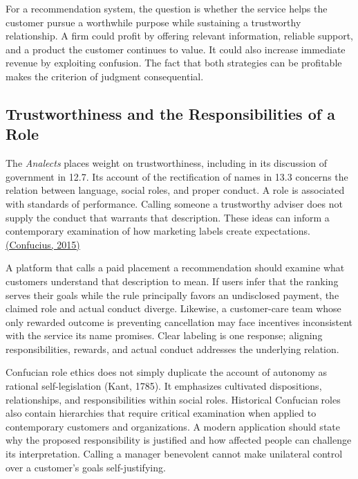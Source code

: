For a recommendation system, the question is whether the service helps
the customer pursue a worthwhile purpose while sustaining a trustworthy
relationship. A firm could profit by offering relevant information,
reliable support, and a product the customer continues to value. It
could also increase immediate revenue by exploiting confusion. The fact
that both strategies can be profitable makes the criterion of judgment
consequential.

\hypertarget{M09-trustworthiness-and-the-responsibilities-of-a-role}{%
\subsection{Trustworthiness and the Responsibilities of a
Role}\label{M09-trustworthiness-and-the-responsibilities-of-a-role}}

\noindent \noindent The \emph{Analects} places weight on trustworthiness,
including in its discussion of government in 12.7. Its account of the
rectification of names in 13.3 concerns the relation between language,
social roles, and proper conduct. A role is associated with standards of
performance. Calling someone a trustworthy adviser does not supply the
conduct that warrants that description. These ideas can inform a
contemporary examination of how marketing labels create expectations.
\href{https://scholarworks.iu.edu/bitstreams/d1f62d31-9082-41d0-999f-4c3efa0c8857/download}{(Confucius,
2015)}

A platform that calls a paid placement a recommendation should examine
what customers understand that description to mean. If users infer that
the ranking serves their goals while the rule principally favors an
undisclosed payment, the claimed role and actual conduct diverge.
Likewise, a customer-care team whose only rewarded outcome is preventing
cancellation may face incentives inconsistent with the service its name
promises. Clear labeling is one response; aligning responsibilities,
rewards, and actual conduct addresses the underlying relation.

Confucian role ethics does not simply duplicate the account of autonomy
as rational self-legislation (Kant, 1785). It emphasizes cultivated
dispositions, relationships, and responsibilities within social roles.
Historical Confucian roles also contain hierarchies that require
critical examination when applied to contemporary customers and
organizations. A modern application should state why the proposed
responsibility is justified and how affected people can challenge its
interpretation. Calling a manager benevolent cannot make unilateral
control over a customer's goals self-justifying.

